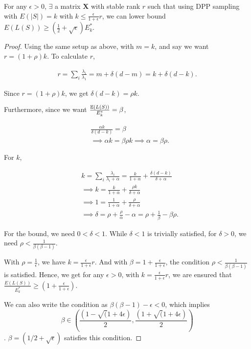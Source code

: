 \documentclass[12pt]{sty/colt2019/colt2018-arxiv}
\begin{document}
 \begin{lemma}
	For any $\epsilon>0$, $\exists$ a matrix $\mathbf{X}$ with stable rank $r$ such that using DPP sampling with $E(|S|) = k$ with $k \leq \frac{\epsilon}{1+\epsilon} r$, we can lower bound $E(L(S)) \geq \left(\frac1{2} + \sqrt{\epsilon}\right)E^*_k $.
\end{lemma}
\begin{proof}
	
Using the same setup as above, with $m=k$, and say we want $r=(1+\rho) k$.  To calculate $r$, 

 
 \begin{align*}
r = \sum_i \frac {\lambda_i}{ \lambda_1} = m + \delta (d-m) = k + \delta(d-k).
 \end{align*}
 
 

Since  $r=(1+\rho) k$, we get $\delta(d-k) = \rho k$. 

Furthermore, since we want $\frac{\mathbb E(L(S))}{E^*_k} = \beta$, 

\begin{align*}
&\frac{\alpha k }{\delta(d-k) } = \beta \\ & \implies \alpha k = \beta \rho k \implies \alpha = \beta \rho.
\end{align*}

For $k$, 

\begin{align*}
& k = \sum_i \frac{\lambda_i}{\lambda_i + \alpha} 
 = \frac{k}{1+\alpha} + \frac{\delta(d-k)}{\delta+\alpha} \\
& \implies k =  \frac{k}{1+\alpha} + \frac{\rho k}{\delta+\alpha}\\
&\implies 1 =  \frac{1}{1+\alpha} + \frac{\rho}{\delta+\alpha} \\
&\implies \delta = \rho + \frac{\rho}{\alpha} - \alpha = \rho + \frac1 {\beta} - \beta \rho.
\end{align*}

For the bound, we need $0 < \delta < 1$. While $\delta < 1$ is trivially satisfied, for $\delta > 0$, we need $\rho < \frac{1}{\beta (\beta - 1)}$.

With $\rho = \frac1 {\epsilon}$, we have $k = \frac{\epsilon}{1+ \epsilon}r$. And with $\beta =1+\frac{\epsilon}{1+ \epsilon} $, the condition $\rho < \frac{1}{\beta (\beta - 1)}$ is satisfied. Hence, we get for any $\epsilon>0$, with $k = \frac{\epsilon}{1+ \epsilon}r $, we are ensured that $\frac{E(L(S))}{E^*_k} \geq \left( 1 + \frac{\epsilon}{1+\epsilon} \right)$.                                                                                                                                                                                             

We can also write the condition as $\beta (\beta -1) -\epsilon < 0$, which implies
 \[\beta \in \left(\frac{( 1- \sqrt(1+ 4 \epsilon)}{2}, \frac{( 1+ \sqrt(1+ 4 \epsilon)}{2} \right)\]. $\beta = (1/2 + \sqrt{\epsilon})$ satisfies this condition.
 

\end{proof}
\end{document}
